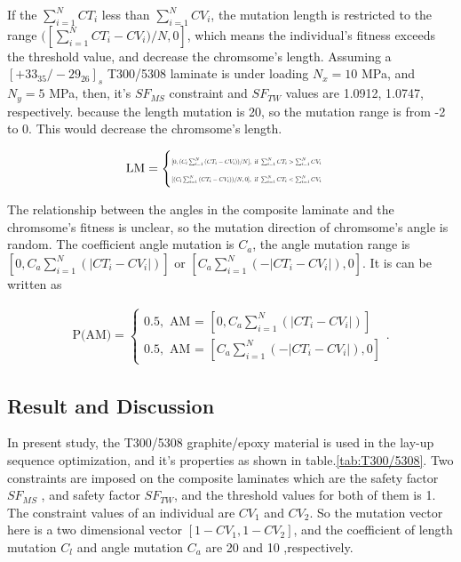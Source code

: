 If the $\sum_{i=1}^{N}{CT_i}$ less than $\sum_{i=1}^{N}{CV_i}$, the
mutation length is restricted to the range $([\sum_{i=1}^{N}{CT_i-CV_i})/N,0]$,
which means the individual's fitness exceeds the threshold value, and decrease
the chromsome's length.  Assuming a $[+33_{35}/-29_{26}]_s$ T300/5308 laminate
is under loading $N_{x}=10$ MPa, and $N_{y}=5$ MPa, then, it's $SF_{MS}$
constraint and $SF_{TW}$ values are  1.0912, 1.0747, respectively.
because the length mutation is 20, so the mutation range is from -2 to 0. This
would decrease the chromsome's length. 

\begin{align}
	\text{LM} = 
	\begin{cases}
		\resizebox{.35\textwidth}{!}{$[0,(C_l \sum_{i=1}^{N}{(CT_i-CV_i)})/N], \text{ if }  \sum_{i=1}^{N}{CT_i} > 
		\sum_{i=1}^{N}{CV_i}$}\\
		\resizebox{.35\textwidth}{!}{$[(C_l \sum_{i=1}^{N}{(CT_i-CV_i)})/N,0], \text{ if }  \sum_{i=1}^{N}{CT_i} < 
		\sum_{i=1}^{N}{CV_i}$}\\
	\end{cases} 
\end{align}

The relationship between the angles in the composite laminate and the
chromsome's fitness is unclear, so the mutation direction of chromsome's angle
is random. The coefficient angle mutation is $C_a$, the angle mutation range is
$[0,C_a \sum_{i=1}^{N}{(|CT_i-CV_i|)}]$ or $[C_a
\sum_{i=1}^{N}{(-|CT_i-CV_i|)},0]$. It is can be written as

\begin{align}
	\text{P(AM)} =  
	\begin{cases}
		0.5, \text{ AM = }[0,C_a \sum_{i=1}^{N}{(|CT_i-CV_i|)}] \\ 
	    0.5, \text{ AM = }[C_a \sum_{i=1}^{N}{(-|CT_i-CV_i|)},0]
	\end{cases} \textstyle{.}
\end{align}




\subsection{Result and Discussion}
In present study, the T300/5308 graphite/epoxy material is used in the
lay-up sequence optimization, and it's properties as shown in
table.\ref{tab:T300/5308}. Two constraints are imposed on the composite
laminates which are the safety factor $SF_{MS}$ , and safety factor $SF_{TW}$,
and the threshold values for both of them is 1. The constraint values of an
individual are $CV_1$ and $CV_2$. So the mutation vector here is a two
dimensional vector $[1 - CV_1, 1 - CV_2 ]$, and the coefficient of length
mutation $C_l$ and angle mutation $C_a$ are  20 and 10 ,respectively.

